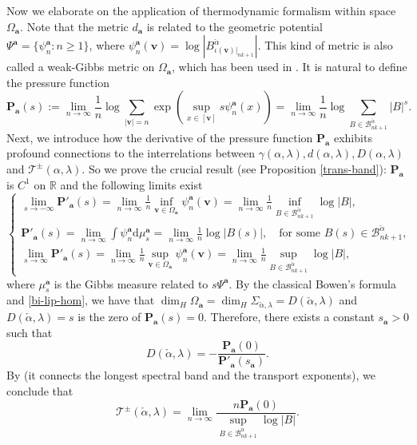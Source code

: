 \documentclass[reqno,11pt,graphicx,]{amsart}
\numberwithin{equation}{section}
\theoremstyle{plain}
\newcommand{\R}{{\mathbb R}}
\newcommand{\B}{{\mathcal B}}
\newcommand{\p}{\mathbf P}
\newcommand{\3}{\mathbf{3}}
\newcommand{\ma}{\mathbf{a}}
\newcommand{\mv}{\mathbf{v}}
\begin{document}
	Now we elaborate on the application of thermodynamic formalism within space $\Omega_{\ma}$. Note that the metric $d_{\ma}$ is related to the geometric potential $\Psi^{\ma}=\{\psi^{\ma}_n:n\geq1\}$, where $\psi^{\ma}_n(\mv)=\log|B^{\check{\alpha}}_{\iota(\mv)|_{nk+1}}|$. This kind of metric is also called a weak-Gibbs metric on $\Omega_{\ma}$, which has been used in \cite{Qu2016,Qu2018}. It is natural to define the pressure function
	\begin{equation*}
		\p_{\ma}(s):=\lim\limits_{n\to\infty}\frac{1}{n}\log\sum_{|\mv|=n}\exp(\sup_{x\in[\mv]}s\psi^{\ma}_{n}(x))=\lim\limits_{n\to\infty}\frac{1}{n}\log\sum_{B\in\B^{\check{\alpha}}_{nk+1}}|B|^s.
	\end{equation*}
	Next, we introduce how the derivative of the pressure function $\p_{\ma}$ exhibits profound connections to the interrelations between $\gamma(\alpha,\lambda), d(\alpha,\lambda), D(\alpha,\lambda) $ and $\mathcal{T}^{\pm}(\alpha,\lambda)$. So we prove the crucial result (see Proposition \ref{trans-band}): $\p_{\ma}$ is $C^1$ on $\R$ and the following limits exist
	\begin{equation}\label{id-2}
		\begin{cases}
			\lim\limits_{s\to-\infty}\p'_{\ma}(s)=\lim\limits_{n\to\infty}\frac{1}{n}\inf_{\mv\in\Omega_{\ma}}\psi_{n}^{\ma}(\mv)
=\lim\limits_{n\to\infty}\frac{1}{n}\inf_{B\in\B^{\check{\alpha}}_{nk+1}}\log|B|,\\
			\p'_{\ma}(s)=\lim\limits_{n\to\infty}\int\psi^{\ma}_n\mathrm{d}\mu^{\ma}_{s}
=\lim\limits_{n\to\infty}\frac{1}{n}\log|B(s)|,\quad\text{for some $B(s)\in\B^{\check{\alpha}}_{nk+1}$},\\
			\lim\limits_{s\to\infty}\p'_{\ma}(s)=\lim\limits_{n\to\infty}\frac{1}{n}
\sup_{\mv\in\Omega_{\ma}}\psi_{n}^{\ma}(\mv)=\lim\limits_{n\to\infty}\frac{1}{n}\sup_{B\in\B^{\check{\alpha}}_{nk+1}}\log|B|,
		\end{cases}
	\end{equation}
	where $\mu^{\ma}_{s}$ is the Gibbs measure related to $s\Psi^{\ma}$. By the classical Bowen's formula and \eqref{bi-lip-hom}, we have that $\dim_{H}\Omega_{\ma}=\dim_{H}\Sigma_{\check{\alpha},\lambda}=D(\check{\alpha},\lambda)$ and $D(\check{\alpha},\lambda)=s$ is the zero of $\p_{\ma}(s)=0$. Therefore, there exists a constant $s_{\ma}>0$ such that $$
	D(\check{\alpha},\lambda)=-\frac{\p_{\ma}(0)}{\p'_{\ma}(s_{\ma})}.$$
	By \cite[Proposition 4.8(c) and Proposition 5.1]{DGLQ2015}(it connects the  longest spectral band and the transport exponents), we conclude that
	\begin{equation*}
		\mathcal{T}^{\pm}(\check{\alpha},\lambda)=\lim\limits_{n\to\infty}\frac{n\p_{\ma}(0)}{\sup_{B\in\B^{\check{\alpha}}_{nk+1}}\log|B|}.
	\end{equation*}
	
\end{document}
